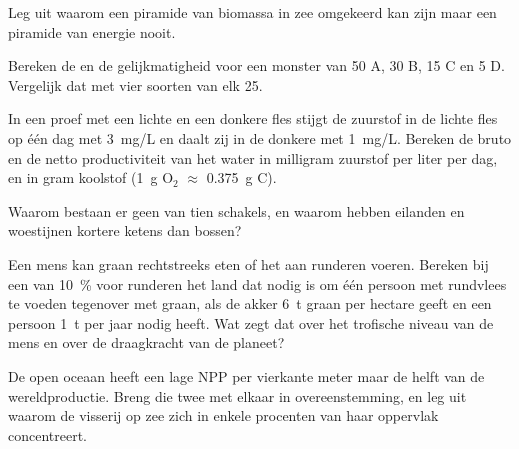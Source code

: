 \begin{exercise}[$\star\star$]\label{exo:b1:ecosystem-organization:6}
Leg uit waarom een piramide van biomassa in zee omgekeerd kan zijn maar een
piramide van energie nooit.
\end{exercise}

\begin{exercise}[$\star\star$]\label{exo:b1:ecosystem-organization:7}
Bereken de  en de gelijkmatigheid voor een monster van 50 A,
30 B, 15 C en 5 D. Vergelijk dat met vier soorten van elk 25.
\end{exercise}

\begin{exercise}[$\star\star$]\label{exo:b1:ecosystem-organization:8}
In een proef met een lichte en een donkere fles stijgt de zuurstof in de
lichte fles op één dag met \qty{3}{mg/L} en daalt zij in de donkere met
\qty{1}{mg/L}. Bereken de bruto en de netto productiviteit van het water in
milligram zuurstof per liter per dag, en in gram koolstof (\qty{1}{g}
$\mathrm{O_2}$ $\approx$ \qty{0.375}{g} C).
\end{exercise}

\begin{exercise}[$\star\star$]\label{exo:b1:ecosystem-organization:9}
Waarom bestaan er geen  van tien schakels, en waarom hebben
eilanden en woestijnen kortere ketens dan bossen?
\end{exercise}

\begin{exercise}[$\star\star\star$]\label{exo:b1:ecosystem-organization:10}
Een mens kan graan rechtstreeks eten of het aan runderen voeren. Bereken bij
een  van \qty{10}{\%} voor runderen het land dat nodig
is om één persoon met rundvlees te voeden tegenover met graan, als de akker
\qty{6}{t} graan per hectare geeft en een persoon \qty{1}{t} per jaar nodig
heeft. Wat zegt dat over het trofische niveau van de mens en over de
draagkracht van de planeet?
\end{exercise}

\begin{exercise}[$\star\star\star$]\label{exo:b1:ecosystem-organization:11}
De open oceaan heeft een lage NPP per vierkante meter maar de helft van de
wereldproductie. Breng die twee met elkaar in overeenstemming, en leg uit
waarom de visserij op zee zich in enkele procenten van haar oppervlak
concentreert.
\end{exercise}

